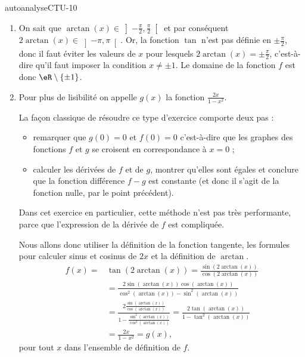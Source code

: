 
\begin{corrige}{autoanalyseCTU-10}

\begin{enumerate}
\item On sait que $\arctan(x)\in\left]-\frac{\pi}{2},\frac{\pi}{2}\right[$ et par conséquent $2\arctan(x)\in\left]-\pi, \pi\right[$. Or, la fonction $\tan$ n'est pas définie en $\pm\frac{\pi}{2}$, donc il faut éviter les valeurs de $x$ pour lesquels $2\arctan(x)=\pm\frac{\pi}{2}$, c'est-à-dire qu'il faut imposer la condition $x\neq \pm 1$. Le domaine de la fonction $f$ est donc $\eR\setminus\{\pm 1\}$.
\item Pour plus de lisibilité on appelle $g(x)$ la fonction  $\frac{2x}{1-x^2}$. 

La façon classique de résoudre ce type d'exercice comporte deux pas : 
\begin{itemize}
\item remarquer que $g(0) = 0$ et $f(0) = 0$ c'est-à-dire que les graphes des fonctions $f$ et $g$ se croisent en correspondance à $x= 0$ ; 
\item  calculer les dérivées de $f$ et de $g$, montrer qu'elles sont égales et conclure que la fonction différence $f-g$ est constante (et donc il s'agit de la fonction nulle, par le point précédent).
\end{itemize}
Dans cet exercice en particulier, cette méthode n'est pas très performante, parce que l'expression de la dérivée de $f$ est compliquée. 

Nous allons donc utiliser la définition de la fonction tangente, les formules pour calculer sinus et cosinus de $2x$ et la définition de $\arctan$. 
\begin{equation*}
  \begin{aligned}
    f(x)=& \tan(2 \arctan (x)) = \frac{\sin(2 \arctan (x))}{\cos(2 \arctan (x))} \\
    &= \frac{2\sin(\arctan (x))\cos(\arctan (x))}{\cos^2(\arctan (x))-\sin^2(\arctan (x))}\\
    &=\frac{2\frac{\sin(\arctan (x))}{\cos(\arctan (x))}}{1-\frac{\sin^2(\arctan (x))}{\cos^2(\arctan (x))}} = \frac{2\tan(\arctan (x))}{1-\tan^2(\arctan (x))}\\
    &= \frac{2x}{1-x^2} = g(x),
  \end{aligned}
\end{equation*}
pour tout $x$ dans l'ensemble de définition de $f$.
\end{enumerate}


\end{corrige}   
